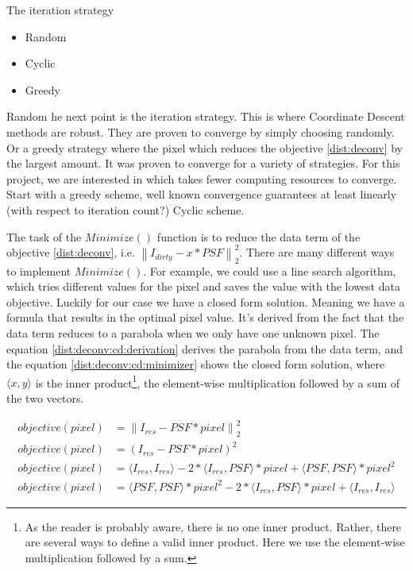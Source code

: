 The iteration strategy
\begin{itemize}
	\item Random
	\item Cyclic
	\item Greedy
\end{itemize}
Random 
he next point is the iteration strategy. This is where Coordinate Descent methods are robust. They are proven to converge by simply choosing randomly. Or a greedy strategy where the pixel which reduces the objective \eqref{dist:deconv} by the largest amount. It was proven to converge for a variety of strategies. For this project, we are interested in which takes fewer computing resources to converge. 
Start with a greedy scheme, well known convergence guarantees at least linearly (with respect to iteration count?)\cite{luo1992convergence}
Cyclic scheme.

The task of the $Minimize()$ function is to reduce the data term of the objective \eqref{dist:deconv}, i.e. $\left \| I_{dirty} - x * PSF \right \|_2^2$. There are many different ways to implement $Minimize()$. For example,  we could use a line search algorithm, which tries different values for the pixel and saves the value with the lowest data objective. Luckily for our case we have a closed form solution. Meaning we have a formula that results in the optimal pixel value. It's derived from the fact that the data term reduces to a parabola when we only have one unknown pixel. The equation \eqref{dist:deconv:cd:derivation} derives the parabola from the data term, and the equation \eqref{dist:deconv:cd:minimizer} shows the closed form solution, where $\langle x, y\rangle$ is the inner product\footnote{As the reader is probably aware, there is no one inner product. Rather, there are several ways to define a valid inner product. Here we use the element-wise multiplication followed by a sum.}, the element-wise multiplication followed by a sum of the two vectors.

\begin{equation} \label{dist:deconv:cd:derivation}
\begin{split}
objective(pixel) & = \left \| I_{res} - PSF * pixel \right \|_2^2\\
objective(pixel) & = (I_{res} - PSF * pixel)^2\\
objective(pixel) & = \langle I_{res}, I_{res} \rangle - 2*\langle I_{res},PSF\rangle * pixel + \langle PSF, PSF \rangle * pixel^2\\
objective(pixel) & = \langle PSF, PSF \rangle * pixel^2 - 2*\langle I_{res},PSF\rangle * pixel + \langle I_{res}, I_{res} \rangle
\end{split}
\end{equation}

